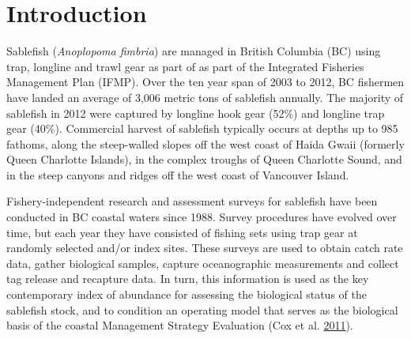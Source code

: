 \documentclass[12pt]{article}\usepackage[]{graphicx}\usepackage[]{color}
\begin{document}

\frontmatter


\renewcommand{\headrulewidth}{0.5pt}  %
\renewcommand{\footrulewidth}{0.5pt}  %

\hypertarget{introduction}{%
\section{Introduction}\label{introduction}}

Sablefish (\emph{Anoplopoma fimbria}) are managed in British Columbia (BC) using trap, longline and trawl gear as part of as part of the Integrated Fisheries Management Plan (IFMP). Over the ten year span of 2003 to 2012, BC fishermen have landed an average of 3,006 metric tons of sablefish annually. The majority of sablefish in 2012 were captured by longline hook gear (52\%) and longline trap gear (40\%). Commercial harvest of sablefish typically occurs at depths up to 985 fathoms, along the steep-walled slopes off the west coast of Haida Gwaii (formerly Queen Charlotte Islands), in the complex troughs of Queen Charlotte Sound, and in the steep canyons and ridges off the west coast of Vancouver Island.

Fishery-independent research and assessment surveys for sablefish have been conducted in BC coastal waters since 1988. Survey procedures have evolved over time, but each year they have consisted of fishing sets using trap gear at randomly selected and/or index sites. These surveys are used to obtain catch rate data, gather biological samples, capture oceanographic measurements and collect tag release and recapture data. In turn, this information is used as the key contemporary index of abundance for assessing the biological status of the sablefish stock, and to condition an operating model that serves as the biological basis of the coastal Management Strategy Evaluation (Cox et al. \protect\hyperlink{ref-Cox2011}{2011}).
\end{document}
